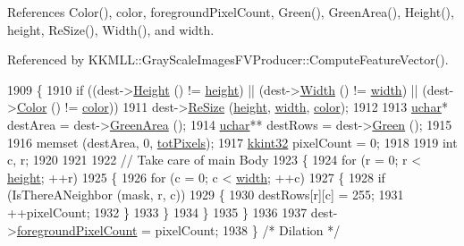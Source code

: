 References Color(), color, foreground\+Pixel\+Count, Green(), Green\+Area(), Height(), height, Re\+Size(), Width(), and width.



Referenced by K\+K\+M\+L\+L\+::\+Gray\+Scale\+Images\+F\+V\+Producer\+::\+Compute\+Feature\+Vector().


\begin{DoxyCode}
1909 \{
1910   \textcolor{keywordflow}{if}  ((dest->\hyperlink{class_k_k_b_1_1_raster_af8d10d15697d5b92fb9595c48b529feb}{Height} () != \hyperlink{class_k_k_b_1_1_raster_af39ff189de4fbb6de98392e187efafb7}{height})  ||  (dest->\hyperlink{class_k_k_b_1_1_raster_aa2780c0b7ae75b7b595f99329689c1f6}{Width} () != 
      \hyperlink{class_k_k_b_1_1_raster_ae0bcc103e191c3421d7692dc69ceb554}{width})  ||  (dest->\hyperlink{class_k_k_b_1_1_raster_a644248f99009d64ac4b8fef4a22aff25}{Color} ()  != \hyperlink{class_k_k_b_1_1_raster_a482384d89cc53fa4f36276307c746854}{color}))
1911     dest->\hyperlink{class_k_k_b_1_1_raster_ad0a4daf2ba175cedf00ce975bb746417}{ReSize} (\hyperlink{class_k_k_b_1_1_raster_af39ff189de4fbb6de98392e187efafb7}{height}, \hyperlink{class_k_k_b_1_1_raster_ae0bcc103e191c3421d7692dc69ceb554}{width}, \hyperlink{class_k_k_b_1_1_raster_a482384d89cc53fa4f36276307c746854}{color});
1912 
1913   \hyperlink{namespace_k_k_b_ace9969169bf514f9ee6185186949cdf7}{uchar}*   destArea = dest->\hyperlink{class_k_k_b_1_1_raster_af6ceacfa7835a295d239d141627dbec7}{GreenArea} ();
1914   \hyperlink{namespace_k_k_b_ace9969169bf514f9ee6185186949cdf7}{uchar}**  destRows = dest->\hyperlink{class_k_k_b_1_1_raster_a2dbd81f2cb60b3716bcf6467050dde93}{Green}     ();
1915 
1916   memset (destArea, 0, \hyperlink{class_k_k_b_1_1_raster_a9b08c4a0ca0a35435a478599635f1dc0}{totPixels});
1917   \hyperlink{namespace_k_k_b_a8fa4952cc84fda1de4bec1fbdd8d5b1b}{kkint32}  pixelCount = 0;
1918 
1919   \textcolor{keywordtype}{int}  c, r;
1920 
1921 
1922   \textcolor{comment}{// Take care of main Body}
1923   \{
1924     \textcolor{keywordflow}{for}  (r = 0;  r < \hyperlink{class_k_k_b_1_1_raster_af39ff189de4fbb6de98392e187efafb7}{height};  ++r)
1925     \{
1926       \textcolor{keywordflow}{for}  (c = 0;  c < \hyperlink{class_k_k_b_1_1_raster_ae0bcc103e191c3421d7692dc69ceb554}{width};  ++c)
1927       \{
1928         \textcolor{keywordflow}{if}  (IsThereANeighbor (mask, r, c)) 
1929         \{
1930           destRows[r][c] = 255;
1931           ++pixelCount;
1932         \}
1933       \}
1934     \}
1935   \}
1936 
1937   dest->\hyperlink{class_k_k_b_1_1_raster_aa7e86253f4b9c347da718732e44b60e8}{foregroundPixelCount} = pixelCount;
1938 \}  \textcolor{comment}{/* Dilation */}
\end{DoxyCode}
